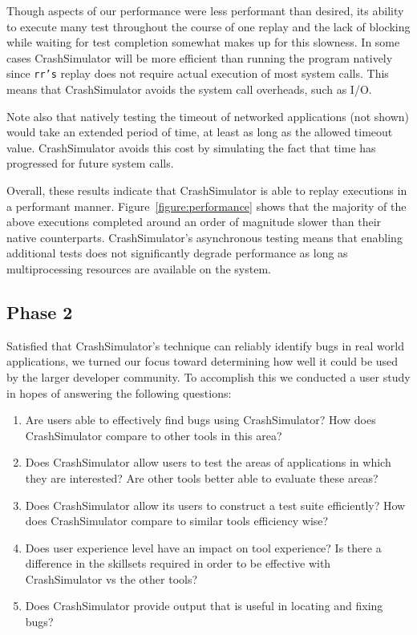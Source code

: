Though aspects of our performance were less performant than desired, its
ability to execute many test throughout the course of one replay and the
lack of blocking while waiting for test completion somewhat makes up for
this slowness. In some cases CrashSimulator will be more efficient than
running the program natively since {\tt rr's} replay does not require
actual execution of most system calls.  This means that CrashSimulator
avoids the system call overheads, such as I/O.

Note also that natively testing the timeout of networked applications (not
shown) would take an extended period of time, at least as long as the
allowed timeout value.  CrashSimulator avoids this cost by simulating the
fact that time has progressed for future system calls.

Overall, these results indicate that CrashSimulator is able to replay
executions in a performant manner.  Figure~\ref{figure:performance} shows
that the majority of the above executions completed around an order of
magnitude slower than their native counterparts.  CrashSimulator's
asynchronous testing means that enabling additional tests does not
significantly degrade performance as long as multiprocessing resources are
available on the system.


\subsection{Phase 2}

Satisfied that CrashSimulator's technique can reliably identify bugs in
real world applications, we turned our focus toward determining how well it
could be used by the larger developer community.  To accomplish this we
conducted a user study in hopes of answering the following questions:

\begin{enumerate}

\item Are users able to effectively find bugs using CrashSimulator?  How
does CrashSimulator compare to other tools in this area?

\item Does CrashSimulator allow users to test the areas of
applications in which they are interested?  Are other tools better able to
evaluate these areas?

\item Does CrashSimulator allow its users to construct a test suite
efficiently?  How does CrashSimulator compare to similar tools
efficiency wise?

\item Does user experience level have an impact on tool experience?  Is
there a difference in the skillsets required in order to be effective
with CrashSimulator vs the other tools?

\item Does CrashSimulator provide output that is useful in locating and
fixing bugs?

\end{enumerate}

